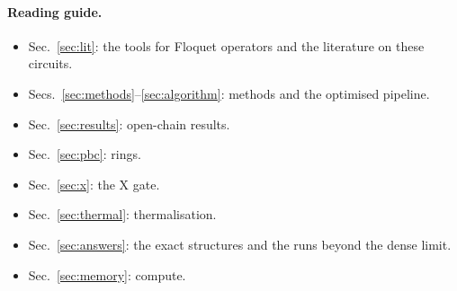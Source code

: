 \paragraph{Reading guide.}
\begin{itemize}
\item Sec.~\ref{sec:lit}: the tools for Floquet operators and the literature on these circuits.
\item Secs.~\ref{sec:methods}--\ref{sec:algorithm}: methods and the optimised pipeline.
\item Sec.~\ref{sec:results}: open-chain results.
\item Sec.~\ref{sec:pbc}: rings.
\item Sec.~\ref{sec:x}: the X gate.
\item Sec.~\ref{sec:thermal}: thermalisation.
\item Sec.~\ref{sec:answers}: the exact structures and the runs beyond the dense limit.
\item Sec.~\ref{sec:memory}: compute.
\end{itemize}
